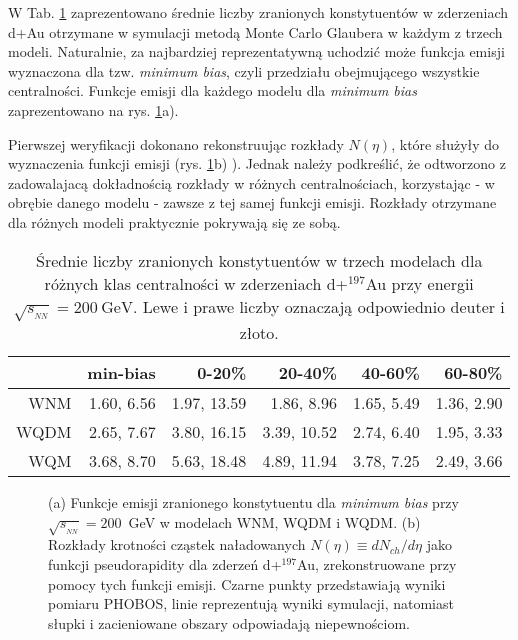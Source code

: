 \documentclass[a4paper,12pt]{article}
\begin{document}
W Tab. \ref{table:d-Au0} zaprezentowano średnie liczby zranionych konstytuentów w zderzeniach d+Au otrzymane w symulacji metodą Monte Carlo Glaubera w każdym z trzech modeli. Naturalnie, za najbardziej reprezentatywną uchodzić może funkcja emisji wyznaczona dla tzw. \textit{minimum bias}, czyli przedziału obejmującego wszystkie centralności. Funkcje emisji dla każdego modelu dla \textit{minimum bias} zaprezentowano na rys. \ref{fig:F0}a).

Pierwszej weryfikacji dokonano rekonstruując rozkłady $N(\eta)$, które służyły do wyznaczenia funkcji emisji (rys. \ref{fig:F0}b) ). Jednak należy podkreślić, że odtworzono z zadowalajacą dokładnością rozkłady w różnych centralnościach, korzystając - w obrębie danego modelu - zawsze z tej samej funkcji emisji. Rozkłady otrzymane dla różnych modeli praktycznie pokrywają się ze sobą.


\begin{table}[H]\centering
\begin{tabular}{|r|r|r|r|r|r|} \hline
 & min-bias & 0-20\% & 20-40\% & 40-60\% & 60-80\% \\ \hline
WNM  & 1.60, 6.56 & 1.97, 13.59 & 1.86,  8.96 & 1.65, 5.49 & 1.36, 2.90 \\ \hline
WQDM & 2.65, 7.67 & 3.80, 16.15 & 3.39, 10.52 & 2.74, 6.40 & 1.95, 3.33 \\ \hline
WQM  & 3.68, 8.70 & 5.63, 18.48 & 4.89, 11.94 & 3.78, 7.25 & 2.49, 3.66 \\ \hline
\end{tabular}
\caption{Średnie liczby zranionych konstytuentów w trzech modelach dla różnych klas centralności w zderzeniach d+$^{197}$Au przy energii $\sqrt{s_{_{NN}}} = 200~\text{GeV}$. Lewe i prawe liczby oznaczają odpowiednio deuter i złoto.}\label{table:d-Au0}
\end{table}
\begin{figure}[h!]
\begin{center}
%
\hspace{0.3cm}
%
\caption{(a) Funkcje emisji zranionego konstytuentu dla \textit{minimum bias} przy $\sqrt{s_{_{NN}}}=200$~GeV w modelach WNM, WQDM i WQDM. (b) Rozkłady krotności cząstek naładowanych $N(\eta)\equiv dN_{ch}/d\eta$ jako funkcji pseudorapidity dla zderzeń d+$^{197}$Au, zrekonstruowane przy pomocy tych funkcji emisji. Czarne punkty przedstawiają wyniki pomiaru PHOBOS, linie reprezentują wyniki symulacji, natomiast słupki i zacieniowane obszary odpowiadają niepewnościom.}\label{fig:F0}
\end{center}
\end{figure}
\end{document}

